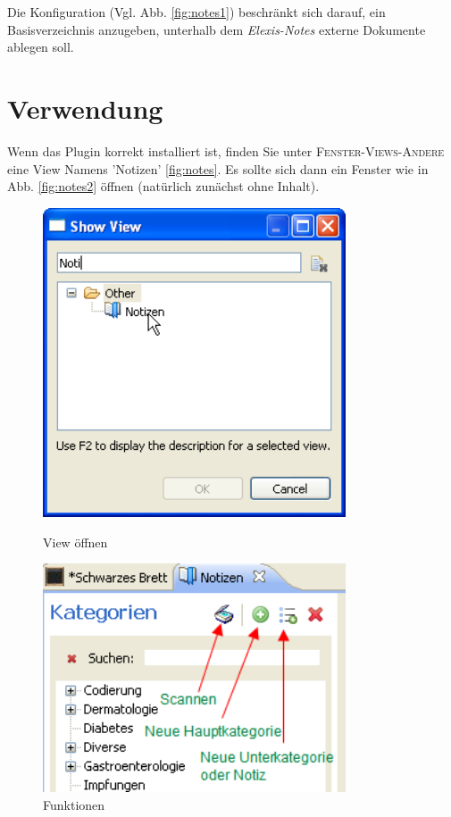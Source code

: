 \documentclass[a4paper]{scrartcl}
\begin{document}
Die Konfiguration (Vgl. Abb. \ref{fig:notes1}) beschränkt sich darauf, ein Basisverzeichnis anzugeben, unterhalb dem  \textit{Elexis-Notes} externe Dokumente ablegen soll.

\section {Verwendung}
Wenn das Plugin korrekt installiert ist, finden Sie unter \textsc{Fenster-Views-Andere} eine View Namens 'Notizen' \ref{fig:notes}. Es sollte sich dann ein Fenster wie in Abb. \ref{fig:notes2} öffnen (natürlich zunächst ohne Inhalt).

\begin{figure}[htbp]
     \begin{minipage}{0.4\textwidth}
      \centering
       \includegraphics[width=0.8\textwidth]{notesview}
  \caption{View öffnen}\label{fig:notes}
     \end{minipage}\hfill
     \begin{minipage}{0.5\textwidth}
      \centering
       \includegraphics[width=0.8\textwidth]{notestools}
       \caption{Funktionen}
       \label{fig:tools}
     \end{minipage}
   \end{figure}
\end{document}
